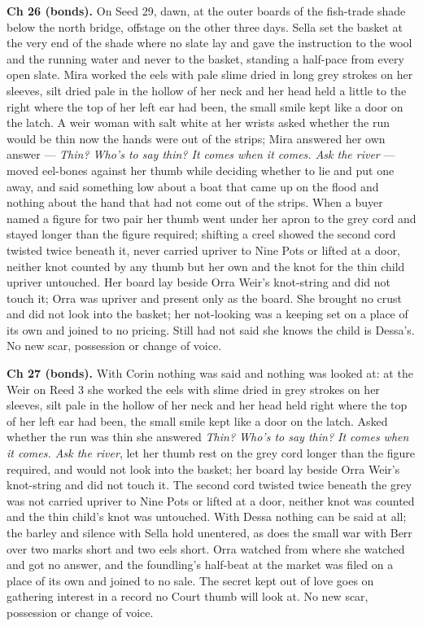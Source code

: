 \documentclass{design/chronicle}
\begin{document}
{\textbf{Ch 26 (bonds).} On Seed 29, dawn, at the outer boards of the fish-trade shade below the north bridge, offstage on the other three days. Sella set the basket at the very end of the shade where no slate lay and gave the instruction to the wool and the running water and never to the basket, standing a half-pace from every open slate. Mira worked the eels with pale slime dried in long grey strokes on her sleeves, silt dried pale in the hollow of her neck and her head held a little to the right where the top of her left ear had been, the small smile kept like a door on the latch. A weir woman with salt white at her wrists asked whether the run would be thin now the hands were out of the strips; Mira answered her own answer — \emph{Thin? Who’s to say thin? It comes when it comes. Ask the river} — moved eel-bones against her thumb while deciding whether to lie and put one away, and said something low about a boat that came up on the flood and nothing about the hand that had not come out of the strips. When a buyer named a figure for two pair her thumb went under her apron to the grey cord and stayed longer than the figure required; shifting a creel showed the second cord twisted twice beneath it, never carried upriver to Nine Pots or lifted at a door, neither knot counted by any thumb but her own and the knot for the thin child upriver untouched. Her board lay beside Orra Weir’s knot-string and did not touch it; Orra was upriver and present only as the board. She brought no crust and did not look into the basket; her not-looking was a keeping set on a place of its own and joined to no pricing. Still had not said she knows the child is Dessa’s. No new scar, possession or change of voice.

\textbf{Ch 27 (bonds).} With Corin nothing was said and nothing was looked at: at the Weir on Reed 3 she worked the eels with slime dried in grey strokes on her sleeves, silt pale in the hollow of her neck and her head held right where the top of her left ear had been, the small smile kept like a door on the latch. Asked whether the run was thin she answered \emph{Thin? Who’s to say thin? It comes when it comes. Ask the river}, let her thumb rest on the grey cord longer than the figure required, and would not look into the basket; her board lay beside Orra Weir’s knot-string and did not touch it. The second cord twisted twice beneath the grey was not carried upriver to Nine Pots or lifted at a door, neither knot was counted and the thin child’s knot was untouched. With Dessa nothing can be said at all; the barley and silence with Sella hold unentered, as does the small war with Berr over two marks short and two eels short. Orra watched from where she watched and got no answer, and the foundling’s half-beat at the market was filed on a place of its own and joined to no sale. The secret kept out of love goes on gathering interest in a record no Court thumb will look at. No new scar, possession or change of voice.

}
\end{document}
